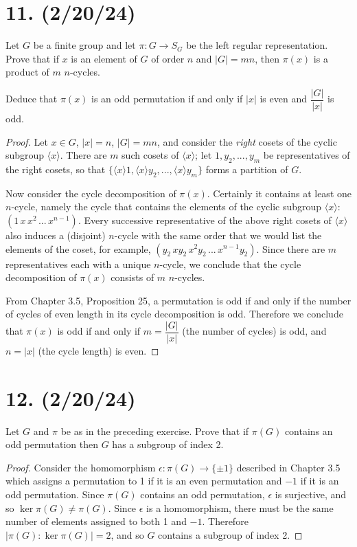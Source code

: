\documentclass{article}
\begin{document}
\section*{11. (2/20/24)}

Let $G$ be a finite group and let $\pi: G \rightarrow S_G$ be the left regular representation. Prove that if $x$ is an element of $G$ of order $n$ and $|G| = mn$, then $\pi(x)$ is a product of $m$ $n$-cycles.

Deduce that $\pi(x)$ is an odd permutation if and only if $|x|$ is even and $\dfrac{|G|}{|x|}$ is odd.

\begin{proof}
    Let $x \in G$, $|x| = n$, $|G| = mn$, and consider the \emph{right} cosets of the cyclic subgroup $\langle x \rangle$. There are $m$ such cosets of $\langle x \rangle$; let $1, y_2, ..., y_m$ be representatives of the right cosets, so that $\{ \langle x \rangle 1, \langle x \rangle y_2, ..., \langle x \rangle y_m \}$ forms a partition of $G$.

    Now consider the cycle decomposition of $\pi(x)$. Certainly it contains at least one $n$-cycle, namely the cycle that contains the elements of the cyclic subgroup $\langle x \rangle$: $(1\, x\, x^2\, ...\, x^{n - 1})$. Every successive representative of the above right cosets of $\langle x \rangle$ also induces a (disjoint) $n$-cycle with the same order that we would list the elements of the coset, for example, $(y_2\, xy_2\, x^2y_2\, ...\, x^{n - 1}y_2)$. Since there are $m$ representatives each with a unique $n$-cycle, we conclude that the cycle decomposition of $\pi(x)$ consists of $m$ $n$-cycles.

    From Chapter 3.5, Proposition 25, a permutation is odd if and only if the number of cycles of even length in its cycle decomposition is odd. Therefore we conclude that $\pi(x)$ is odd if and only if $m = \dfrac{|G|}{|x|}$ (the number of cycles) is odd, and $n = |x|$ (the cycle length) is even.
\end{proof}

\section*{12. (2/20/24)}

Let $G$ and $\pi$ be as in the preceding exercise. Prove that if $\pi(G)$ contains an odd permutation then $G$ has a subgroup of index 2.

\begin{proof}
    Consider the homomorphism $\epsilon: \pi(G) \rightarrow \{ \pm{1} \}$ described in Chapter 3.5 which assigns a permutation to 1 if it is an even permutation and $-1$ if it is an odd permutation. Since $\pi(G)$ contains an odd permutation, $\epsilon$ is surjective, and so $\ker \pi(G) \neq \pi(G)$. Since $\epsilon$ is a homomorphism, there must be the same number of elements assigned to both 1 and $-1$. Therefore $|\pi(G) : \ker \pi(G)| = 2$, and so $G$ contains a subgroup of index 2.
\end{proof}
\end{document}

